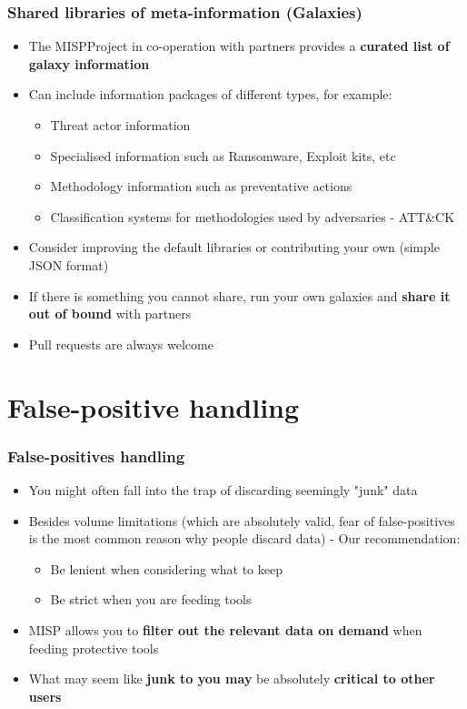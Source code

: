 \begin{frame}
\frametitle{Shared libraries of meta-information (Galaxies)}
\begin{itemize}
    \item The MISPProject in co-operation with partners provides a {\bf curated list of galaxy information}
	\item Can include information packages of different types, for example:
	\begin{itemize}
		\item Threat actor information
		\item Specialised information such as Ransomware, Exploit kits, etc
		\item Methodology information such as preventative actions
		\item Classification systems for methodologies used by adversaries - ATT\&CK
	\end{itemize}
	\item Consider improving the default libraries or contributing your own (simple JSON format)
    \item If there is something you cannot share, run your own galaxies and {\bf share it out of bound} with partners
	\item Pull requests are always welcome
\end{itemize}
\end{frame}

\section{False-positive handling}

\begin{frame}
\frametitle{False-positives handling}
\begin{itemize}
	\item You might often fall into the trap of discarding seemingly "junk" data
	\item Besides volume limitations (which are absolutely valid, fear of false-positives is the most common reason why people discard data) - Our recommendation:
	\begin{itemize}
		\item Be lenient when considering what to keep
		\item Be strict when you are feeding tools
	\end{itemize}
\item MISP allows you to {\bf filter out the relevant data on demand} when feeding protective tools
\item What may seem like {\bf junk to you may} be absolutely {\bf critical to other users}
\end{itemize}
\end{frame}

